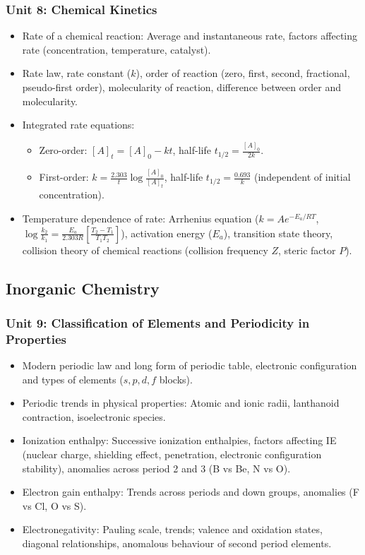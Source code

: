 \documentclass[11pt,a4paper]{article}
\begin{document}
\subsubsection{Unit 8: Chemical Kinetics}
\begin{itemize}
  \item Rate of a chemical reaction: Average and instantaneous rate, factors affecting rate (concentration, temperature, catalyst).
  \item Rate law, rate constant ($k$), order of reaction (zero, first, second, fractional, pseudo-first order), molecularity of reaction, difference between order and molecularity.
  \item Integrated rate equations:
  \begin{itemize}
    \item Zero-order: $[A]_t = [A]_0 - kt$, half-life $t_{1/2} = \frac{[A]_0}{2k}$.
    \item First-order: $k = \frac{2.303}{t}\log\frac{[A]_0}{[A]_t}$, half-life $t_{1/2} = \frac{0.693}{k}$ (independent of initial concentration).
  \end{itemize}
  \item Temperature dependence of rate: Arrhenius equation ($k = A e^{-E_a/RT}$, $\log\frac{k_2}{k_1} = \frac{E_a}{2.303R}[\frac{T_2 - T_1}{T_1 T_2}]$), activation energy ($E_a$), transition state theory, collision theory of chemical reactions (collision frequency $Z$, steric factor $P$).
\end{itemize}

\subsection{Inorganic Chemistry}

\subsubsection{Unit 9: Classification of Elements and Periodicity in Properties}
\begin{itemize}
  \item Modern periodic law and long form of periodic table, electronic configuration and types of elements ($s, p, d, f$ blocks).
  \item Periodic trends in physical properties: Atomic and ionic radii, lanthanoid contraction, isoelectronic species.
  \item Ionization enthalpy: Successive ionization enthalpies, factors affecting IE (nuclear charge, shielding effect, penetration, electronic configuration stability), anomalies across period 2 and 3 (B vs Be, N vs O).
  \item Electron gain enthalpy: Trends across periods and down groups, anomalies (F vs Cl, O vs S).
  \item Electronegativity: Pauling scale, trends; valence and oxidation states, diagonal relationships, anomalous behaviour of second period elements.
\end{itemize}
\end{document}
